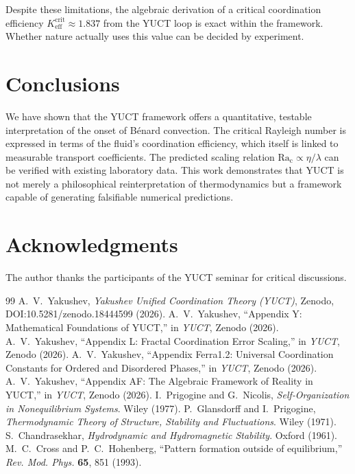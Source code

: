 \documentclass[12pt,a4paper]{article}
\begin{document}
	Despite these limitations, the algebraic derivation of a critical coordination efficiency \(K_{\mathrm{eff}}^{\mathrm{crit}} \approx 1.837\) from the YUCT loop is exact within the framework.  Whether nature actually uses this value can be decided by experiment.
	
	\section{Conclusions}
	
	We have shown that the YUCT framework offers a quantitative, testable interpretation of the onset of B\'{e}nard convection.  The critical Rayleigh number is expressed in terms of the fluid's coordination efficiency, which itself is linked to measurable transport coefficients.  The predicted scaling relation \(\mathrm{Ra_c} \propto \eta/\lambda\) can be verified with existing laboratory data.  This work demonstrates that YUCT is not merely a philosophical reinterpretation of thermodynamics but a framework capable of generating falsifiable numerical predictions.
	
	\section*{Acknowledgments}
	The author thanks the participants of the YUCT seminar for critical discussions.
	
	\begin{thebibliography}{99}
		 A.~V.~Yakushev, \emph{Yakushev Unified Coordination Theory (YUCT)}, Zenodo, DOI:10.5281/zenodo.18444599 (2026).
		 A.~V.~Yakushev, ``Appendix Y: Mathematical Foundations of YUCT,'' in \emph{YUCT}, Zenodo (2026).
		 A.~V.~Yakushev, ``Appendix L: Fractal Coordination Error Scaling,'' in \emph{YUCT}, Zenodo (2026).
		 A.~V.~Yakushev, ``Appendix Ferra1.2: Universal Coordination Constants for Ordered and Disordered Phases,'' in \emph{YUCT}, Zenodo (2026).
		 A.~V.~Yakushev, ``Appendix AF: The Algebraic Framework of Reality in YUCT,'' in \emph{YUCT}, Zenodo (2026).
		 I.~Prigogine and G.~Nicolis, \emph{Self‑Organization in Nonequilibrium Systems}. Wiley (1977).
		 P.~Glansdorff and I.~Prigogine, \emph{Thermodynamic Theory of Structure, Stability and Fluctuations}. Wiley (1971).
		 S.~Chandrasekhar, \emph{Hydrodynamic and Hydromagnetic Stability}. Oxford (1961).
		 M.~C.~Cross and P.~C.~Hohenberg, ``Pattern formation outside of equilibrium,'' \emph{Rev. Mod. Phys.} \textbf{65}, 851 (1993).
	\end{thebibliography}
	
\end{document}
